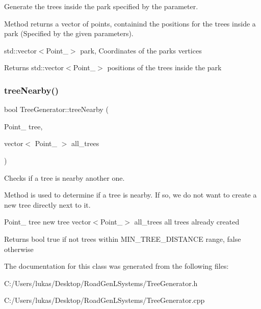 Generate the trees inside the park specified by the parameter. 

Method returns a vector of points, containind the positions for the trees inside a park (Specified by the given parameters).

std\+::vector$<$\+Point\+\_$>$ park, Coordinates of the parks vertices

\begin{DoxyReturn}{Returns}
std\+::vector$<$\+Point\+\_$>$ positions of the trees inside the park 
\end{DoxyReturn}
\hypertarget{class_tree_generator_a580ff42e61ae496662683d61383916b6}{}\label{class_tree_generator_a580ff42e61ae496662683d61383916b6} 
\subsubsection{\texorpdfstring{tree\+Nearby()}{treeNearby()}}
{\footnotesize\ttfamily bool Tree\+Generator\+::tree\+Nearby (\begin{DoxyParamCaption}\item[{Point\+\_\+2}]{tree,  }\item[{vector$<$ Point\+\_\+2 $>$}]{all\+\_\+trees }\end{DoxyParamCaption})\hspace{0.3cm}{\ttfamily [static]}}



Checks if a tree is nearby another one. 

Method is used to determine if a tree is nearby. If so, we do not wan\textquotesingle{}t to create a new tree directly next to it.

Point\+\_ tree new tree  vector$<$\+Point\+\_$>$ all\+\_\+trees all trees already created

\begin{DoxyReturn}{Returns}
bool true if not trees within M\+I\+N\+\_\+\+T\+R\+E\+E\+\_\+\+D\+I\+S\+T\+A\+N\+CE range, false otherwise 
\end{DoxyReturn}


The documentation for this class was generated from the following files\+:\begin{DoxyCompactItemize}
\item 
C\+:/\+Users/lukas/\+Desktop/\+Road\+Gen\+L\+Systems/Tree\+Generator.\+h\item 
C\+:/\+Users/lukas/\+Desktop/\+Road\+Gen\+L\+Systems/Tree\+Generator.\+cpp\end{DoxyCompactItemize}
